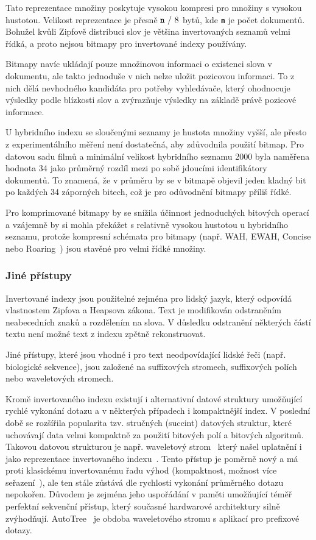 \documentclass[11pt,letterpaper,oneside,openright]{book}
\newcommand{\bftt}[1]{\texttt{\textbf{#1}}}
\begin{document}
Tato reprezentace množiny poskytuje vysokou kompresi pro množiny s vysokou
hustotou. Velikost reprezentace je přesně $\bftt{n}\ /\ 8$ bytů, kde \bftt{n}
je počet dokumentů. Bohužel kvůli Zipfově distribuci slov je většina
invertovaných seznamů velmi řídká, a proto nejsou bitmapy pro invertované
indexy používány.

Bitmapy navíc ukládají pouze množinovou informaci o existenci slova v
dokumentu, ale takto jednoduše v nich nelze uložit pozicovou informaci. To z
nich dělá nevhodného kandidáta pro potřeby vyhledávače, který ohodnocuje
výsledky podle blízkosti slov a zvýrazňuje výsledky na základě právě pozicové
informace.

U hybridního indexu se sloučenými seznamy je hustota množiny vyšší, ale přesto
z experimentálního měření není dostatečná, aby zdůvodnila použití bitmap. Pro
datovou sadu filmů a minimální velikost hybridního seznamu 2000 byla naměřena
hodnota 34 jako průměrný rozdíl mezi po sobě jdoucími identifikátory dokumentů.
To znamená, že v průměru by se v bitmapě objevil jeden kladný bit po každých 34
záporných bitech, což je pro odůvodnění bitmapy příliš řídké.

Pro komprimované bitmapy by se snížila účinnost jednoduchých bitových operací a
vzájemně by si mohla překážet s relativně vysokou hustotou u hybridního
seznamu, protože kompresní schémata pro bitmapy (např. WAH, EWAH, Concise nebo
Roaring~\cite{DBLP:journals/corr/LemireKK16}) jsou stavěné pro velmi řídké
množiny.

\subsubsection{Jiné přístupy}
Invertované indexy jsou použitelné zejména pro lidský jazyk, který odpovídá
vlastnostem Zipfova a Heapsova zákona. Text je modifikován odstraněním
neabecedních znaků a rozdělením na slova. V důsledku odstranění některých částí
textu není možné text z indexu zpětně rekonstruovat.

Jiné přístupy, které jsou vhodné i pro text neodpovídající lidské řeči (např.
biologické sekvence), jsou založené na suffixových stromech, suffixových polích
nebo waveletových stromech.

Kromě invertovaného indexu existují i alternativní datové struktury umožňující
rychlé vykonání dotazu a v některých případech i kompaktnější index. V poslední
době se rozšířila popularita tzv. stručných (succint) datových struktur, které
uchovávají data velmi kompaktně za použití bitových polí a bitových algoritmů.
Takovou datovou strukturou je např. waveletový
strom~\cite{Grossi:2003:HET:644108.644250} který našel uplatnění i jako
reprezentace invertovaného
indexu~\cite{Ferragina:2007:CRS:1240233.1240243,FERRAGINA2009849}. Tento
přístup je poměrně nový a má proti klasickému invertovanému řadu výhod
(kompaktnost, možnost více seřazení~\cite{Navarro2010}), ale ten stále zůstává
dle rychlosti vykonání průměrného dotazu nepokořen. Důvodem je zejména jeho
uspořádání v paměti umožňující téměř perfektní sekvenční přístup, který
současné hardwarové architektury silně zvýhodňují. AutoTree~\cite{Weber2007} je
obdoba waveletového stromu s aplikací pro prefixové dotazy.
\end{document}
